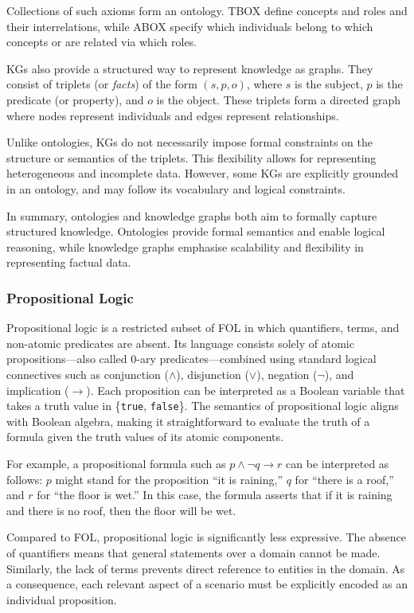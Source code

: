 Collections of such axioms form an ontology.
%
\Gls{TBOX} define concepts and roles and their interrelations, while \gls{ABOX} specify which individuals belong to which concepts or are related via which roles.

\Glspl{KG} also provide a structured way to represent knowledge as graphs.
%
They consist of triplets (or \emph{facts}) of the form $(s, p, o)$, where $s$ is the subject, $p$ is the predicate (or property), and $o$ is the object.
%
These triplets form a directed graph where nodes represent individuals and edges represent relationships.

Unlike ontologies, KGs do not necessarily impose formal constraints on the structure or semantics of the triplets.
%
This flexibility allows for representing heterogeneous and incomplete data.
%
However, some \glspl{KG} are explicitly grounded in an ontology, and may follow its vocabulary and logical constraints.

In summary, ontologies and knowledge graphs both aim to formally capture structured knowledge.
%
Ontologies provide formal semantics and enable logical reasoning, while knowledge graphs emphasise scalability and flexibility in representing factual data.


\subsubsection{Propositional Logic}\label{subsubsec:propositional-logic}
%
Propositional logic is a restricted subset of \gls{FOL} in which quantifiers, terms, and non-atomic predicates are absent.
%
Its language consists solely of atomic propositions—also called 0-ary predicates—combined using standard logical connectives such as conjunction ($\land$), disjunction ($\lor$), negation ($\lnot$), and implication ($\rightarrow$).
%
Each proposition can be interpreted as a Boolean variable that takes a truth value in \{\texttt{true}, \texttt{false}\}.
%
The semantics of propositional logic aligns with Boolean algebra, making it straightforward to evaluate the truth of a formula given the truth values of its atomic components.

For example, a propositional formula such as $p \land \lnot q \rightarrow r$ can be interpreted as follows:
%
$p$ might stand for the proposition ``it is raining,'' $q$ for ``there is a roof,'' and $r$ for ``the floor is wet.''
%
In this case, the formula asserts that if it is raining and there is no roof, then the floor will be wet.

Compared to \gls{FOL}, propositional logic is significantly less expressive.
%
The absence of quantifiers means that general statements over a domain cannot be made.
%
Similarly, the lack of terms prevents direct reference to entities in the domain.
%
As a consequence, each relevant aspect of a scenario must be explicitly encoded as an individual proposition.

